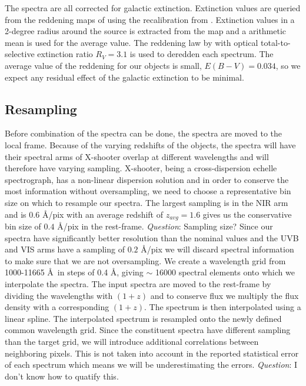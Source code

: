 \documentclass{aa}    %
\newcommand{\sectlabel}[1]{\label{sect:#1}}
\newcommand{\todo}[3]{{\color{#2}\emph{#1}: #3}}
\newcommand{\qtodo}[1]{\todo{Question}{red}{#1}}
\begin{document}
The spectra are all corrected for galactic extinction. Extinction values are queried from the reddening maps of \citet{Schlegel1998} using the recalibration from \citet{Schlafly2011}. Extinction values in a 2-degree radius around the source is extracted from the map and a arithmetic mean is used for the average value. The reddening law by \citet{Fitzpatrick1999} with optical total-to-selective extinction ratio $R_V = 3.1$ is used to deredden each spectrum. The average value of the reddening for our objects is small, $E(B-V) = 0.034$, so we expect any residual effect of the galactic extinction to be minimal. 





\subsection{Resampling} \sectlabel{rebin}

Before combination of the spectra can be done, the spectra are moved to the local frame. Because of the varying redshifts of the objects, the spectra will have their spectral arms of X-shooter overlap at different wavelengths and will therefore have varying sampling. X-shooter, being a cross-dispersion echelle spectrograph, has a non-linear dispersion solution and in order to conserve the most information without oversampling, we need to choose a representative bin size on which to resample our spectra. The largest sampling is in the NIR arm and is $0.6$ \AA/pix with an average redshift of $z_{avg} = 1.6$ gives us the conservative bin size of $0.4$ \AA/pix in the rest-frame. 
\qtodo{Sampling size?}
Since our spectra have significantly better resolution than the nominal values and the UVB and VIS arms have a sampling of $0.2$ \AA/pix we will discard spectral information to make sure that we are not oversampling. We create a wavelength grid from 1000-11665 \AA~in steps of 0.4 \AA, giving $\sim$ 16000 spectral elements onto which we interpolate the spectra. The input spectra are moved to the rest-frame by dividing the wavelengths with $(1 + z)$ and to conserve flux we multiply the flux density with a corresponding $(1 + z)$. The spectrum is then interpolated using a linear spline. The interpolated spectrum is resampled onto the newly defined common wavelength grid. Since the constituent spectra have different sampling than the target grid, we will introduce additional correlations between neighboring pixels. This is not taken into account in the reported statistical error of each spectrum which means we will be underestimating the errors. \qtodo{I don't know how to quatify this.}
\end{document}
